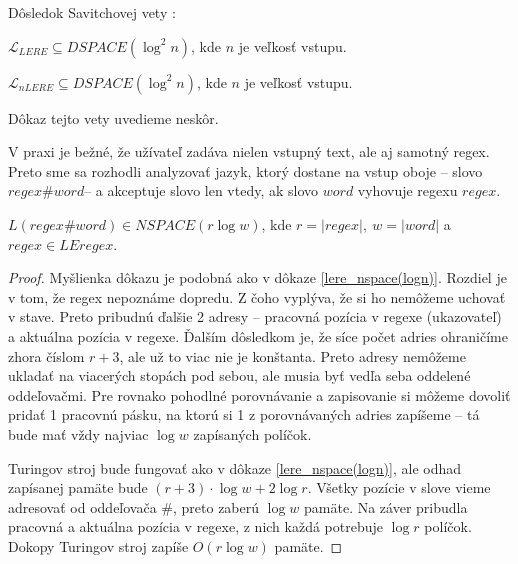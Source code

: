 \documentclass{svk_long_sk}
\def\le{LEregex}
\def\lel{\mathscr{L}_{LERE}}
\def\nlel{\mathscr{L}_{nLERE}}
\begin{document}
Dôsledok Savitchovej vety \cite{Savitch}:
\begin{theorem}\label{lel_dspace}
$\lel \subseteq DSPACE(\log^2 n)$, kde $n$ je veľkosť vstupu.
\end{theorem}
\begin{theorem}\label{nlel_dspace}
$\nlel \subseteq DSPACE(\log^2 n)$, kde $n$ je veľkosť vstupu.
\end{theorem}
Dôkaz tejto vety uvedieme neskôr.

V praxi je bežné, že užívateľ zadáva nielen vstupný text, ale aj samotný regex. Preto sme sa rozhodli analyzovať jazyk, ktorý dostane na vstup oboje -- slovo $regex\#word$-- a akceptuje slovo len vtedy, ak slovo $word$ vyhovuje regexu $regex$.

\begin{theorem}
$L(regex\#word) \in NSPACE(r \log w)$, kde $r = |regex|,~w = |word|$ a $regex \in \le$.
\end{theorem}
\begin{proof}
Myšlienka dôkazu je podobná ako v dôkaze \ref{lere_nspace(logn)}. Rozdiel je v tom, že regex nepoznáme dopredu. Z čoho vyplýva, že si ho nemôžeme uchovať v stave. Preto pribudnú ďalšie 2 adresy -- pracovná pozícia v regexe (ukazovateľ) a aktuálna pozícia v regexe. Ďalším dôsledkom je, že síce počet adries ohraničíme zhora číslom $r+3$, ale už to viac nie je konštanta. Preto adresy nemôžeme ukladať na viacerých stopách pod sebou, ale musia byť vedľa seba oddelené oddeľovačmi. Pre rovnako pohodlné porovnávanie a zapisovanie si môžeme dovoliť pridať 1 pracovnú pásku, na ktorú si 1 z porovnávaných adries zapíšeme -- tá bude mať vždy najviac $\log w$ zapísaných políčok.

Turingov stroj bude fungovať ako v dôkaze \ref{lere_nspace(logn)}, ale odhad zapísanej pamäte bude $(r+3)\cdot \log w + 2\log r$. Všetky pozície v slove vieme adresovať od oddeľovača \#, preto zaberú $\log w$ pamäte. Na záver pribudla pracovná a aktuálna pozícia v regexe, z nich každá potrebuje $\log r$ políčok. Dokopy Turingov stroj zapíše $O(r\log w)$ pamäte.
\end{proof}
\end{document}
